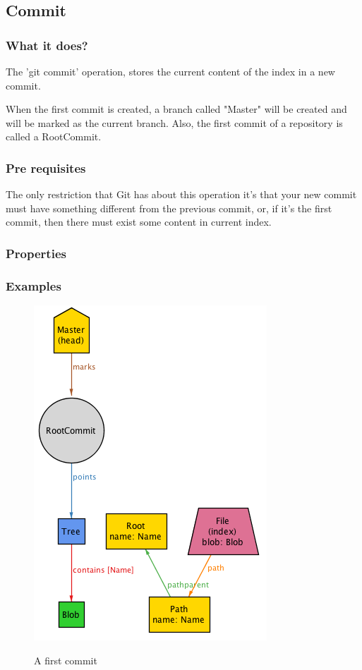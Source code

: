 \pagebreak


\subsection{Commit}

\subsubsection{What it does?}

The 'git commit' operation, stores the current content of the index in a new
commit. \par
When the first commit is created, a branch called "Master" will be created
and will be marked as the current branch. Also, the first commit of a repository
is called a RootCommit. \par

\subsubsection{Pre requisites}

The only restriction that Git has about this operation 
it's that your new commit must have something different from the previous
commit, or, if it's the first commit, then there must exist some content in
current index. \par

\subsubsection{Properties}

\subsubsection{Examples}

\begin{figure} 
	\caption{A first commit}
	\centering
	\includegraphics[scale=0.65]{images/commit1.png}
	\label{fig:commit1}
\end{figure}

